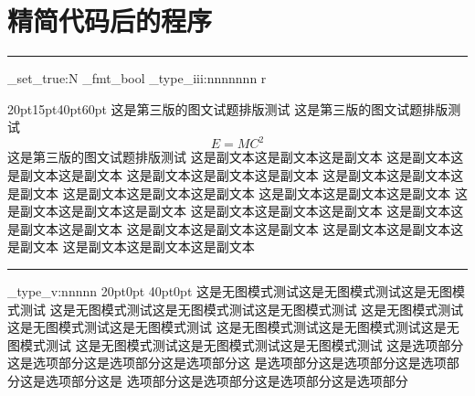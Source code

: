 \documentclass[a4paper,fontset = windowsnew]{ctexbook}
\begin{document}
\chapter{精简代码后的程序}

\parindent=0pt
\ExplSyntaxOn

\rule{\linewidth}{1pt}
\par

\bool_set_true:N \cexam_fmt_bool
    \cexam_type_iii:nnnnnnn
    {r}
      {
      }
      {20pt}{15pt}{40pt}{60pt}
      {
	这是第三版的图文试题排版测试
	这是第三版的图文试题排版测试
	\begin{equation}
	  E=MC^2
	\end{equation}
	这是第三版的图文试题排版测试
      }
      \newline
      {
	这是副文本这是副文本这是副文本
	这是副文本这是副文本这是副文本
	这是副文本这是副文本这是副文本
	这是副文本这是副文本这是副文本
	这是副文本这是副文本这是副文本
	这是副文本这是副文本这是副文本
	这是副文本这是副文本这是副文本
	这是副文本这是副文本这是副文本
	这是副文本这是副文本这是副文本
	这是副文本这是副文本这是副文本
	这是副文本这是副文本这是副文本
	这是副文本这是副文本这是副文本
      }
%
      \newpage
      \rule{\linewidth}{1pt}
      \par
      \cexam_type_v:nnnnn
      {20pt}{0pt}
      {40pt}{0pt}
      {
	这是无图模式测试这是无图模式测试这是无图模式测试
	这是无图模式测试这是无图模式测试这是无图模式测试
	这是无图模式测试这是无图模式测试这是无图模式测试
	这是无图模式测试这是无图模式测试这是无图模式测试
	这是无图模式测试这是无图模式测试这是无图模式测试
      }
      \newline
      这是选项部分这是选项部分这是选项部分这是选项部分这
      是选项部分这是选项部分这是选项部分这是选项部分这是
      选项部分这是选项部分这是选项部分这是选项部分
\end{document}
